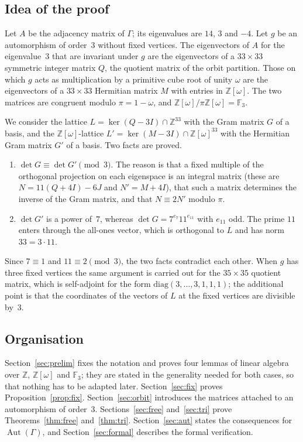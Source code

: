 \documentclass[11pt,a4paper]{article}
\theoremstyle{remark}
\newcommand{\ZZ}{\mathbb{Z}}
\newcommand{\FF}{\mathbb{F}}
\newcommand{\Aut}{\operatorname{Aut}}
\begin{document}
\subsection{Idea of the proof}
Let $A$ be the adjacency matrix of $\Gamma$; its eigenvalues are $14$, $3$ and $-4$. Let $g$ be an automorphism of
order~3 without fixed vertices. The eigenvectors of $A$ for the eigenvalue~$3$ that are invariant under $g$ are the
eigenvectors of a $33\times33$ symmetric integer matrix $Q$, the quotient matrix of the orbit partition. Those on
which $g$ acts as multiplication by a primitive cube root of unity $\omega$ are the eigenvectors of a $33\times33$
Hermitian matrix $M$ with entries in $\ZZ[\omega]$. The two matrices are congruent modulo $\pi=1-\omega$, and
$\ZZ[\omega]/\pi\ZZ[\omega]=\FF_3$.

We consider the lattice $L=\ker(Q-3I)\cap\ZZ^{33}$ with the Gram matrix $G$ of a basis, and the $\ZZ[\omega]$-lattice
$L'=\ker(M-3I)\cap\ZZ[\omega]^{33}$ with the Hermitian Gram matrix $G'$ of a basis. Two facts are proved.
\begin{enumerate}[label=(\arabic*)]
\item $\det G\equiv\det G'\pmod 3$. The reason is that a fixed multiple of the orthogonal projection on each
eigenspace is an integral matrix (these are $N=11(Q+4I)-6J$ and $N'=M+4I$), that such a matrix determines the inverse
of the Gram matrix, and that $N\equiv 2N'$ modulo $\pi$.
\item $\det G'$ is a power of~$7$, whereas $\det G=7^{e_7}11^{e_{11}}$ with $e_{11}$ odd. The prime $11$ enters
through the all-ones vector, which is orthogonal to $L$ and has norm $33=3\cdot11$.
\end{enumerate}
Since $7\equiv1$ and $11\equiv2\pmod3$, the two facts contradict each other. When $g$ has three fixed vertices the
same argument is carried out for the $35\times35$ quotient matrix, which is self-adjoint for the form
$\mathrm{diag}(3,\dots,3,1,1,1)$; the additional point is that the coordinates of the vectors of $L$ at the fixed
vertices are divisible by~$3$.

\subsection{Organisation}
Section~\ref{sec:prelim} fixes the notation and proves four lemmas of linear algebra over $\ZZ$, $\ZZ[\omega]$ and
$\FF_3$; they are stated in the generality needed for both cases, so that nothing has to be adapted later.
Section~\ref{sec:fix} proves Proposition~\ref{prop:fix}. Section~\ref{sec:orbit} introduces the matrices attached to
an automorphism of order~3. Sections~\ref{sec:free} and~\ref{sec:tri} prove Theorems~\ref{thm:free}
and~\ref{thm:tri}. Section~\ref{sec:aut} states the consequences for $\Aut(\Gamma)$, and
Section~\ref{sec:formal} describes the formal verification.
\end{document}
